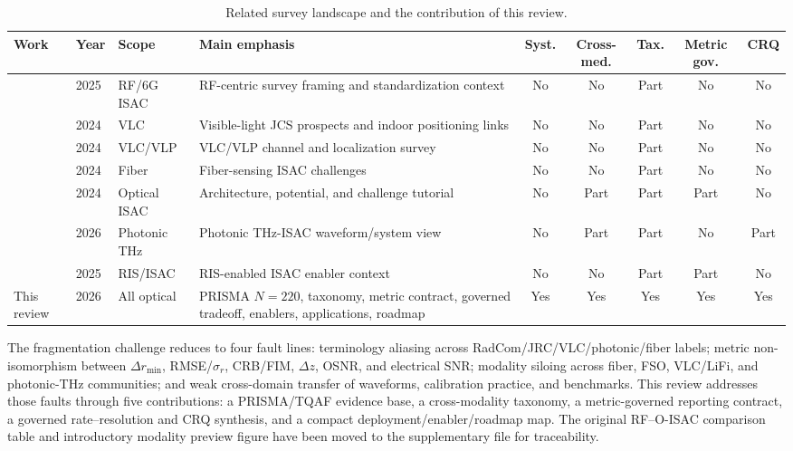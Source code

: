 \documentclass[letterpaper,journal]{IEEEtran}
\begin{document}
\begin{table}[!t]
    \caption{Related survey landscape and the contribution of this review.}
    \label{tab:axis_comparison}
    \centering
    \scriptsize
    \setlength{\tabcolsep}{2.4pt}
    \renewcommand{\arraystretch}{1.08}
    \begin{tabularx}{\textwidth}{@{}p{1.25cm}p{0.58cm}p{1.55cm}Xc c c c c@{}}
        \toprule
        Work & Year & Scope & Main emphasis & Syst. & Cross-med. & Tax. & Metric gov. & CRQ \\
        \midrule
        \cite{O_ISAC_161} & 2025 & RF/6G ISAC & RF-centric survey framing and standardization context & No & No & Part & No & No \\
        \cite{O_ISAC_068} & 2024 & VLC & Visible-light JCS prospects and indoor positioning links & No & No & Part & No & No \\
        \cite{O_ISAC_327} & 2024 & VLC/VLP & VLC/VLP channel and localization survey & No & No & Part & No & No \\
        \cite{O_ISAC_006} & 2024 & Fiber & Fiber-sensing ISAC challenges & No & No & Part & No & No \\
        \cite{O_ISAC_021} & 2024 & Optical ISAC & Architecture, potential, and challenge tutorial & No & Part & Part & Part & No \\
        \cite{O_ISAC_070} & 2026 & Photonic THz & Photonic THz-ISAC waveform/system view & No & Part & Part & No & Part \\
        \cite{O_ISAC_163} & 2025 & RIS/ISAC & RIS-enabled ISAC enabler context & No & No & Part & Part & No \\
        This review & 2026 & All optical & PRISMA $N=220$, taxonomy, metric contract, governed tradeoff, enablers, applications, roadmap & Yes & Yes & Yes & Yes & Yes \\
        \bottomrule
    \end{tabularx}
\end{table}

The fragmentation challenge reduces to four fault lines: terminology aliasing across RadCom/JRC/VLC/photonic/fiber labels; metric non-isomorphism between $\Delta r_{\min}$, RMSE/$\sigma_r$, CRB/FIM, $\Delta z$, OSNR, and electrical SNR; modality siloing across fiber, FSO, VLC/LiFi, and photonic-THz communities; and weak cross-domain transfer of waveforms, calibration practice, and benchmarks. This review addresses those faults through five contributions: a PRISMA/TQAF evidence base, a cross-modality taxonomy, a metric-governed reporting contract, a governed rate--resolution and CRQ synthesis, and a compact deployment/enabler/roadmap map. The original RF--O-ISAC comparison table and introductory modality preview figure have been moved to the supplementary file for traceability.
\end{document}
